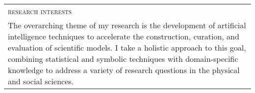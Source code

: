 \centering
\begin{tabularx}{\linewidth}{X}
    \multicolumn{1}{l}{\Large\textsc{\MakeTextLowercase{Research Interests}}}\\\addlinespace
    \midrule

    The overarching theme of my research is the development of artificial
    intelligence techniques to accelerate the construction, curation, and
    evaluation of scientific models. I take a holistic approach to this goal,
    combining statistical and symbolic techniques with domain-specific
    knowledge to address a variety of research questions in the physical and
    social sciences.

\end{tabularx}
